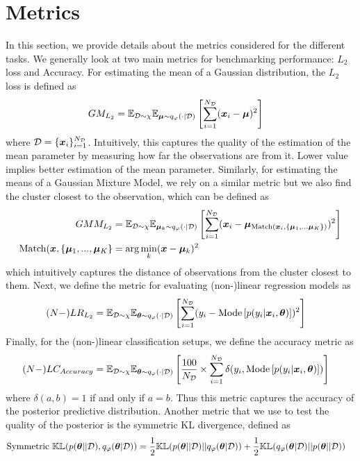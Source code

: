 \section{Metrics}
\label{appdx:metrics}
In this section, we provide details about the metrics considered for the different tasks. We generally look at two main metrics for benchmarking performance: $L_2$ loss and Accuracy. For estimating the mean of a Gaussian distribution, the $L_2$ loss is defined as
\begin{align}
    GM_{L_2} &= \mathbb{E}_{{\mathcal{D}} \sim \chi}\mathbb{E}_{{\bm{\mu}} \sim q_\varphi(\cdot | {\mathcal{D}})}\left[\sum_{i=1}^{N_{\mathcal{D}}} ({\bm{x}}_i - {\bm{\mu}})^2\right]
\end{align}
where ${\mathcal{D}} = \{{\bm{x}}_i\}_{i=1}^{N_{\mathcal{D}}}$. Intuitively, this captures the quality of the estimation of the mean parameter by measuring how far the observations are from it. Lower value implies better estimation of the mean parameter. Similarly, for estimating the means of a Gaussian Mixture Model, we rely on a similar metric but we also find the cluster closest to the observation, which can be defined as
\begin{align}
    GMM_{L_2} &= \mathbb{E}_{{\mathcal{D}} \sim \chi}\mathbb{E}_{{\bm{\mu}}_k \sim q_\varphi(\cdot | {\mathcal{D}})}\left[\sum_{i=1}^{N_{\mathcal{D}}} ({\bm{x}}_i - {\bm{\mu}}_{\text{Match}\left({\bm{x}}_i, \{{\bm{\mu}}_1, ... {\bm{\mu}}_K\}\right)})^2\right] \\
    \text{Match}({\bm{x}}, \{{\bm{\mu}}_1, ..., {\bm{\mu}}_K\} &= \arg\min_k ({\bm{x}} - {\bm{\mu}}_k)^2
\end{align}
which intuitively captures the distance of observations from the cluster closest to them. Next, we define the metric for evaluating (non-)linear regression models as
\begin{align}
    (N-)LR_{L_2} &= \mathbb{E}_{{\mathcal{D}} \sim \chi}\mathbb{E}_{{\bm{\theta}} \sim q_\varphi(\cdot | {\mathcal{D}})}\left[\sum_{i=1}^{N_{\mathcal{D}}} (y_i - \text{Mode}\left[p(y_i | {\bm{x}}_i, {\bm{\theta}})\right])^2\right]
\end{align}
Finally, for the (non-)linear classification setups, we define the accuracy metric as
\begin{align}
    (N-)LC_{Accuracy} &= \mathbb{E}_{{\mathcal{D}} \sim \chi}\mathbb{E}_{{\bm{\theta}} \sim q_\varphi(\cdot | {\mathcal{D}})}\left[\frac{100}{N_{\mathcal{D}}} \times \sum_{i=1}^{N_{\mathcal{D}}} \delta(y_i, \text{Mode}\left[p(y_i | {\bm{x}}_i, {\bm{\theta}})\right])\right]
\end{align}
where $\delta(a, b) = 1$ if and only if $a = b$. Thus this metric captures the accuracy of the posterior predictive distribution. Another metric that we use to test the quality of the posterior is the symmetric KL divergence, defined as
\begin{align}
    \text{Symmetric }\mathbb{KL}(p({\bm{\theta}} || {\mathcal{D}}), q_\varphi({\bm{\theta}} | {\mathcal{D}})) &= \frac{1}{2}\mathbb{KL}(p({\bm{\theta}} || {\mathcal{D}}) || q_\varphi({\bm{\theta}} | {\mathcal{D}})) + \frac{1}{2}\mathbb{KL}(q_\varphi({\bm{\theta}} | {\mathcal{D}}) || p({\bm{\theta}} || {\mathcal{D}}))
\end{align}
